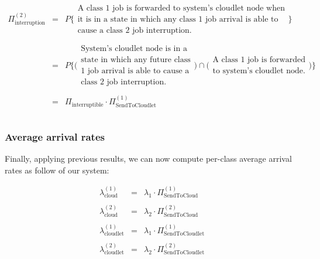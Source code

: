 \documentclass[10pt,a4paper]{article}
\begin{document}
\begin{equation}
\begin{array} {lcl} 
\Pi_{\text{interruption}}^{(2)} & = & P \Bigg\{ \begin{array}{l} \text{A class 1 job is forwarded to system's cloudlet node when} \\ \text{it is in a state in which any class 1 job arrival is able to} \\ \text{cause a class 2 job interruption.} \end{array} \Bigg\} \\
\\
& = & P \Bigg\{ \Bigg( \begin{array}{l} \text{System's cloudlet node is in a} \\ \text{state in which any future class} \\ \text{1 job arrival is able to cause a} \\ \text{class 2 job interruption.} \end{array} \Bigg) \cap \Bigg( \begin{array}{l} \text{A class 1 job is forwarded} \\ \text{to system's cloudlet node.} \end{array} \Bigg) \Bigg\} \\
\\
& = & \Pi_{\text{interruptible}} \cdot \Pi_{\text{SendToCloudlet}}^{(1)}\\
\\
\end{array}
\end{equation}

\subsubsection{Average arrival rates}

Finally, applying previous results, we can now compute per-class average arrival rates as follow of our system:

\begin{equation}
\begin{array} {rcl}

\lambda_{\text{cloud}}^{(1)} & = & \lambda_1\cdot \Pi_{\text{SendToCloud}}^{(1)} \\\\
\lambda_{\text{cloud}}^{(2)} & = & \lambda_2\cdot \Pi_{\text{SendToCloud}}^{(2)} \\\\
\lambda_{\text{cloudlet}}^{(1)} & = & \lambda_1\cdot \Pi_{\text{SendToCloudlet}}^{(1)} \\\\
\lambda_{\text{cloudlet}}^{(2)} & = & \lambda_2\cdot \Pi_{\text{SendToCloudlet}}^{(2)} \\\\
\end{array}
\end{equation}
\end{document}
